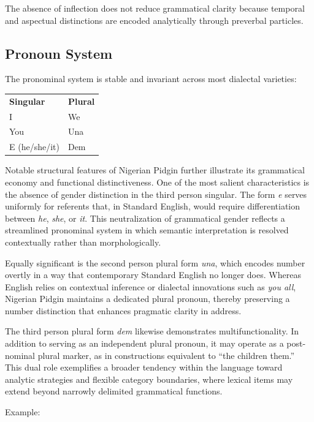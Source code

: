 \documentclass[12pt]{article}
\begin{document}
The absence of inflection does not reduce grammatical clarity because temporal and aspectual distinctions are encoded analytically through preverbal particles.

\subsection{Pronoun System}

The pronominal system is stable and invariant across most dialectal varieties:

\begin{center}
\begin{tabular}{ll}
\textbf{Singular} & \textbf{Plural} \\
I & We \\
You & Una \\
E (he/she/it) & Dem \\
\end{tabular}
\end{center}

Notable structural features of Nigerian Pidgin further illustrate its grammatical economy and functional distinctiveness. One of the most salient characteristics is the absence of gender distinction in the third person singular. The form \textit{e} serves uniformly for referents that, in Standard English, would require differentiation between \textit{he}, \textit{she}, or \textit{it}. This neutralization of grammatical gender reflects a streamlined pronominal system in which semantic interpretation is resolved contextually rather than morphologically.

Equally significant is the second person plural form \textit{una}, which encodes number overtly in a way that contemporary Standard English no longer does. Whereas English relies on contextual inference or dialectal innovations such as \textit{you all}, Nigerian Pidgin maintains a dedicated plural pronoun, thereby preserving a number distinction that enhances pragmatic clarity in address.

The third person plural form \textit{dem} likewise demonstrates multifunctionality. In addition to serving as an independent plural pronoun, it may operate as a post-nominal plural marker, as in constructions equivalent to ``the children them.'' This dual role exemplifies a broader tendency within the language toward analytic strategies and flexible category boundaries, where lexical items may extend beyond narrowly delimited grammatical functions.

Example:
\end{document}
